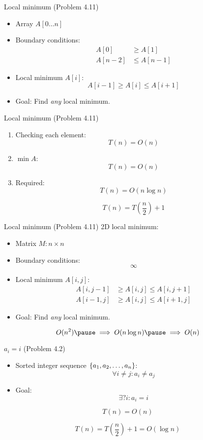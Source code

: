 \begin{frame}{Local minimum (Problem 4.11)}
  \begin{itemize}
	\item Array $A[0 \ldots n]$
	\item Boundary conditions:
	  \begin{align*}
		A[0] &\ge A[1] \\
		A[n-2] &\le A[n-1]
	  \end{align*}
	\item Local minimum $A[i]$:
	  \[
		A[i-1] \ge A[i] \le A[i+1]
	  \]
	\item Goal: Find \emph{any} local minimum.
  \end{itemize}
\end{frame}
\begin{frame}{Local minimum (Problem 4.11)}
  \begin{enumerate}
	\item Checking each element:
	  \[
		T(n) = O(n)
	  \]
	\item $\min A$:
	  \[
		T(n) = O(n)
	  \]
	\pause
	\item Required:
	  \[
		T(n) = O(n \log n)
	  \]

	  \pause
	  \[
		T(n) = T(\frac{n}{2}) + 1
	  \]
  \end{enumerate}
\end{frame}
\begin{frame}{Local minimum (Problem 4.11)}
  2D local minimum:
  \begin{itemize}
	\item Matrix $M: n \times n$
	\item Boundary conditions:
	  \[
		\infty
	  \]
	\item Local minimum $A[i,j]$:
	  \begin{align*}
		A[i,j-1] &\ge A[i,j] \le A[i,j+1] \\
		A[i-1,j] &\ge A[i,j] \le A[i+1,j]
	  \end{align*}
	\item Goal: Find \emph{any} local minimum.
  \end{itemize}

  \pause
  \[
	O(n^2) \pause \implies O(n \log n) \pause \implies O(n)
  \]
\end{frame}
\begin{frame}{$a_i = i$ (Problem 4.2)}
  \begin{itemize}
	\item Sorted integer sequence $\{a_1, a_2, \ldots, a_n\}$:
	  \[
		\forall i \neq j: a_i \neq a_j
	  \]
	\item Goal: 
	  \[
		\exists? i: a_i = i
	  \]
  \end{itemize}

  \pause
  \[
	T(n) = O(n)
  \]

  \pause
  \[
	T(n) = T(\frac{n}{2}) + 1 = O(\log n)
  \]
\end{frame}
